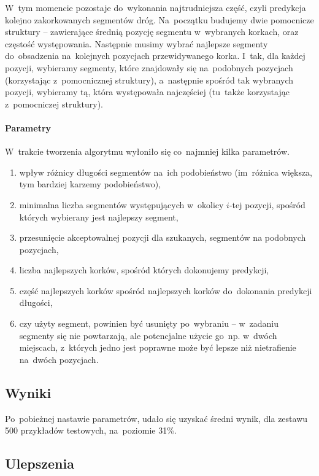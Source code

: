 \documentclass[a4paper,12pt]{mwart}
\begin{document}
W~tym momencie pozostaje do~wykonania najtrudniejsza część, czyli predykcja kolejno zakorkowanych segmentów dróg. Na~początku budujemy dwie pomocnicze struktury -- zawierające średnią pozycję segmentu w~wybranych korkach, oraz częstość występowania. Następnie musimy wybrać najlepsze segmenty do~obsadzenia na~kolejnych pozycjach przewidywanego korka. I~tak, dla każdej pozycji, wybieramy segmenty, które znajdowały się na~podobnych pozycjach (korzystając z~pomocnicznej struktury), a~następnie spośród tak wybranych pozycji, wybieramy tą, która występowała najczęściej (tu~także korzystając z~pomocniczej struktury).

\paragraph{Parametry}

W~trakcie tworzenia algorytmu wyłoniło się co~najmniej kilka parametrów.

\begin{enumerate}
\item wpływ różnicy długości segmentów na~ich podobieństwo (im~różnica większa, tym bardziej karzemy podobieństwo),
\item minimalna liczba segmentów występujących w~okolicy $i$-tej pozycji, spośród których wybierany jest najlepszy segment,
\item przesunięcie akceptowalnej pozycji dla szukanych, segmentów na podobnych pozycjach,
\item liczba najlepszych korków, spośród których dokonujemy predykcji,
\item część najlepszych korków spośród najlepszych korków do~dokonania predykcji długości,
\item czy użyty segment, powinien być usunięty po~wybraniu -- w~zadaniu segmenty się nie powtarzają, ale potencjalne użycie go~np. w~dwóch miejscach, z~których jedno jest poprawne może być lepsze niż nietrafienie na~dwóch pozycjach.
\end{enumerate}

\subsection{Wyniki}

Po~pobieżnej nastawie parametrów, udało się uzyskać średni wynik, dla zestawu 500 przykładów testowych, na~poziomie 31\%.

\subsection{Ulepszenia}
\end{document}
